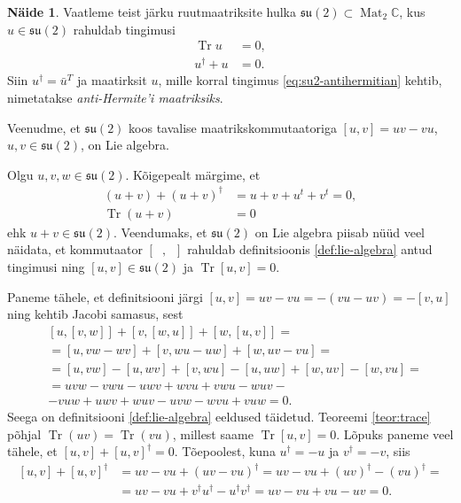 \documentclass[a4paper,12pt]{article}
\theoremstyle{plain}
\theoremstyle{definition}
\newtheorem{naide}{Näide}[section]
\numberwithin{equation}{section}
\def\C{{\mathbb C}}
\def\su2{{\mathfrak{ su}\left(2\right)}}
\DeclareMathOperator{\Mat}{Mat}
\DeclareMathOperator{\Tr}{Tr}
\begin{document}
\begin{naide} \label{naide:su2}
Vaatleme teist järku ruutmaatriksite hulka $\su2 \subset \Mat_2 \C$, kus $u \in \su2$ rahuldab tingimusi
\begin{align}
\Tr u &= 0, \label{eq:su2-tr=0}\\ 
u^\dag + u &= 0. \label{eq:su2-antihermitian}
\end{align}
Siin $u^\dag = \bar{u}^T$ ja maatirksit $u$, mille korral tingimus \ref{eq:su2-antihermitian} kehtib, nimetatakse \emph{anti-Hermite'i maatriksiks}.
 
Veenudme, et $\su2$ koos tavalise maatrikskommutaatoriga $\left[u,v\right] = uv - vu$, $u, v \in \su2$, on Lie algebra.

Olgu $u, v, w \in \su2$. Kõigepealt märgime, et 
\begin{align*}
\left(u + v\right) + \left(u + v\right)^\dag &= u + v + u^t + v^t = 0, \\
\Tr \left(u + v\right) &= 0
\end{align*}
ehk $u + v \in \su2$. Veendumaks, et $\su2$ on Lie algebra piisab nüüd veel näidata, et kommutaator $\left[\phantom{u}, \phantom{u}\right]$ rahuldab definitsioonis \ref{def:lie-algebra} antud tingimusi ning $\left[u,v\right] \in \su2$ ja $\Tr \left[u,v\right] = 0$. 

Paneme tähele, et definitsiooni järgi $\left[u,v\right] = uv - vu = - \left(vu - uv\right) = - \left[v,u\right]$ ning 
kehtib Jacobi samasus, sest
\begin{align*}
&\left[u, \left[v, w\right]\right] + \left[v, \left[w, u\right]\right] + \left[w, \left[u, v\right]\right] = \\
&= \left[u, vw - wv \right] + \left[v, wu - uw \right] + \left[w, uv - vu \right] = \\
&= \left[u, vw\right] - \left[u, wv\right] + \left[v, wu\right] - \left[u, uw\right] + \left[w, uv\right] - \left[w, vu\right] = \\
&= uvw - vwu - uwv + wvu + vwu - wuv - \\
&- vuw + uwv + wuv - uvw - wvu + vuw = 0.
\end{align*}
Seega on definitsiooni \ref{def:lie-algebra} eeldused täidetud. Teoreemi \ref{teor:trace} põhjal $\Tr \left(uv\right) = \Tr \left(vu\right)$, millest saame $\Tr \left[u,v\right] = 0$. Lõpuks paneme veel tähele, et $\left[u,v\right] + \left[u,v\right]^\dag = 0$. Tõepoolest, kuna $u^\dag = -u$ ja $v^\dag = -v$, siis
\begin{align*}
\left[u,v\right] + \left[u,v\right]^\dag &= uv - vu + \left(uv - vu\right)^\dag = uv - vu + \left(uv\right)^\dag - \left(vu\right)^\dag = \\
&= uv - vu + v^\dag u^\dag - u^\dag v^\dag = uv - vu + vu - uv = 0.
\end{align*}
\end{naide}
\end{document}
